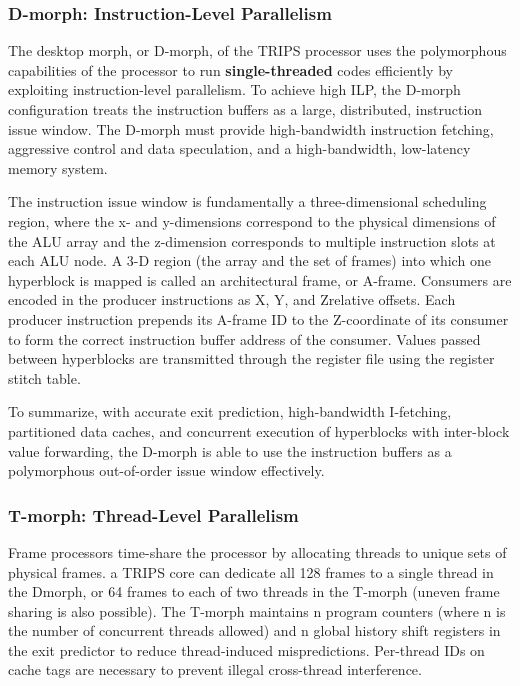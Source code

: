 \documentclass[UTF8,12pt,a4paper]{article}
\begin{document}
\subsubsection{D-morph: Instruction-Level Parallelism}
The desktop morph, or D-morph, of the TRIPS processor
uses the polymorphous capabilities of the processor
to run \textbf{single-threaded} codes efficiently by exploiting
instruction-level parallelism.
To achieve high ILP, the D-morph configuration treats
the instruction buffers as a large, distributed, instruction issue window.
The D-morph must provide high-bandwidth instruction fetching,
aggressive control and data speculation, and a high-bandwidth, low-latency memory system.

The instruction issue window is fundamentally a three-dimensional scheduling region,
where the x- and y-dimensions correspond to the physical dimensions of the ALU array
and the z-dimension corresponds to multiple instruction slots at each ALU node.
A 3-D region (the array and the set of frames) into
which one hyperblock is mapped is called an architectural frame, or A-frame.
Consumers are encoded in the producer instructions as X, Y, and Zrelative offsets.
Each producer instruction prepends its A-frame ID to the Z-coordinate of its consumer to
form the correct instruction buffer address of the consumer.
Values passed between hyperblocks are transmitted through
the register file using the register stitch table.

To summarize, with accurate exit prediction, high-bandwidth I-fetching,
partitioned data caches, and concurrent execution of hyperblocks with inter-block value forwarding,
the D-morph is able to use the instruction buffers as a polymorphous out-of-order issue window effectively.

\subsubsection{T-morph: Thread-Level Parallelism}
Frame processors time-share the processor by allocating threads to unique sets of physical frames.
a TRIPS core can dedicate all 128 frames to a single thread in the Dmorph,
or 64 frames to each of two threads in the T-morph (uneven frame sharing is also possible).
The T-morph maintains n program counters (where n is the number of concurrent threads allowed)
and n global history shift registers in the exit predictor to reduce thread-induced mispredictions.
Per-thread IDs on cache tags are necessary to prevent illegal cross-thread interference.
\end{document}

